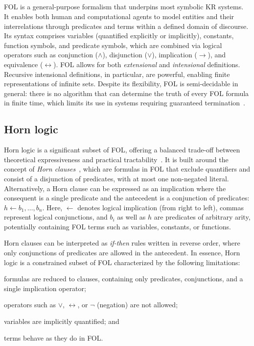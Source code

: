 \subsection[First-order logic]{}\label{subsubsec:first-order-logic}
%
\Gls{FOL} is a general-purpose formalism that underpins most symbolic \gls{KR} systems.
%
It enables both human and computational agents to model entities and their interrelations through predicates and terms within a defined domain of discourse.
%
Its syntax comprises variables (quantified explicitly or implicitly), constants, function symbols, and predicate symbols, which are combined via logical operators such as conjunction (\(\wedge\)), disjunction (\(\vee\)), implication (\(\rightarrow\)), and equivalence (\(\leftrightarrow\)).
%
\Gls{FOL} allows for both \emph{extensional} and \emph{intensional} definitions.
%
Recursive intensional definitions, in particular, are powerful, enabling finite representations of infinite sets.
%
Despite its flexibility, \gls{FOL} is semi-decidable in general: there is no algorithm that can determine the truth of every \gls{FOL} formula in finite time, which limits its use in systems requiring guaranteed termination~\cite{DBLP:conf/dlog/2003handbook}.


\subsection{Horn logic}\label{subsubsec:horn-logic}
%
Horn logic is a significant subset of \gls{FOL}, offering a balanced trade-off between theoretical expressiveness and practical tractability~\cite{DBLP:journals/jcss/Makowsky87}.
%
It is built around the concept of \emph{Horn clauses}~\cite{DBLP:journals/jsyml/Horn51}, which are formulas in \gls{FOL} that exclude quantifiers and consist of a disjunction of predicates, with at most one non-negated literal.
%
Alternatively, a Horn clause can be expressed as an implication where the consequent is a single predicate and the antecedent is a conjunction of predicates: \(h \gets b_1, \dots, b_n\).
%
Here, \(\gets\) denotes logical implication (from right to left), commas represent logical conjunctions, and \(b_i\) as well as \(h\) are predicates of arbitrary arity, potentially containing \gls{FOL} terms such as variables, constants, or functions.

Horn clauses can be interpreted as \emph{if-then} rules written in reverse order, where only conjunctions of predicates are allowed in the antecedent.
%
In essence, Horn logic is a constrained subset of \gls{FOL} characterized by the following limitations:
%
\begin{inlinelist}
%
    \item formulas are reduced to clauses, containing only predicates, conjunctions, and a single implication operator;
    \item operators such as \(\lor\), \(\leftrightarrow\), or \(\neg\) (negation) are not allowed;
    \item variables are implicitly quantified; and
    \item terms behave as they do in \gls{FOL}.
\end{inlinelist}


